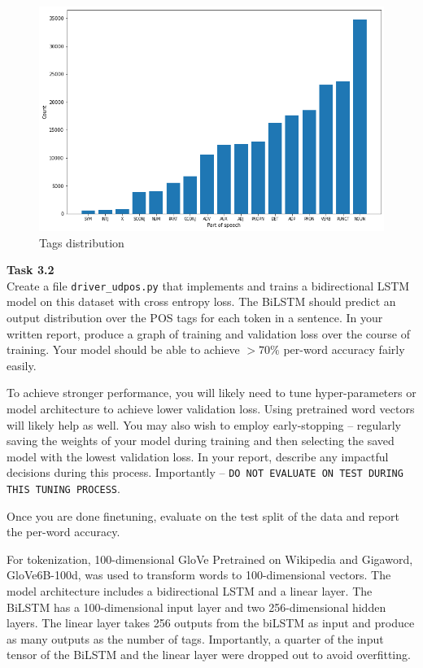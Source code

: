 \documentclass[12pt,article]{article}
\newenvironment{task}[2][Task]
    { \begin{mdframed}[backgroundcolor=gray!20] \textbf{#1 #2} \\}
    {  \end{mdframed}}
\begin{document}
\begin{figure}[H]
    \centering
    \includegraphics[scale=0.5]{tags_dist.png} \par
    \caption{Tags distribution}
    \label{fig:tag-dist}
\end{figure}


\newpage
\begin{task}{3.2} 
Create a file \texttt{driver\_udpos.py} that implements and trains a bidirectional LSTM model on this dataset with cross entropy loss. The BiLSTM should predict an output distribution over the POS tags for each token in a sentence. In your written report, produce a graph of training and validation loss over the course of training. Your model should be able to achieve $>70\%$ per-word accuracy fairly easily.

To achieve stronger performance, you will likely need to tune hyper-parameters or model architecture to achieve lower validation loss. Using pretrained word vectors will likely help as well. You may also wish to employ early-stopping -- regularly saving the weights of your model during training and then selecting the saved model with the lowest validation loss. In your report, describe any impactful decisions during this process. Importantly -- \texttt{DO NOT EVALUATE ON TEST DURING THIS TUNING PROCESS}.

Once you are done finetuning, evaluate on the test split of the data and report the per-word accuracy. 
\end{task}

For tokenization, 100-dimensional GloVe Pretrained on Wikipedia and Gigaword, GloVe6B-100d, was used to transform words to 100-dimensional vectors. The model architecture includes a bidirectional LSTM and a linear layer. The BiLSTM has a 100-dimensional input layer and two 256-dimensional hidden layers. The linear layer takes 256 outputs from the biLSTM as input and produce as many outputs as the number of tags. Importantly, a quarter of the input tensor of the BiLSTM and the linear layer were dropped out to avoid overfitting.
\end{document}
